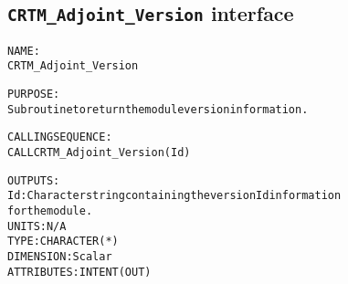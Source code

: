 \subsection{\texttt{CRTM\_Adjoint\_Version} interface}
  \label{sec:CRTM_Adjoint_Version_interface}
  \begin{alltt}
 
  NAME:
        CRTM_Adjoint_Version
 
  PURPOSE:
        Subroutine to return the module version information.
 
  CALLING SEQUENCE:
        CALL CRTM_Adjoint_Version( Id )
 
  OUTPUTS:
        Id:            Character string containing the version Id information
                       for the module.
                       UNITS:      N/A
                       TYPE:       CHARACTER(*)
                       DIMENSION:  Scalar
                       ATTRIBUTES: INTENT(OUT)
 
  \end{alltt}
